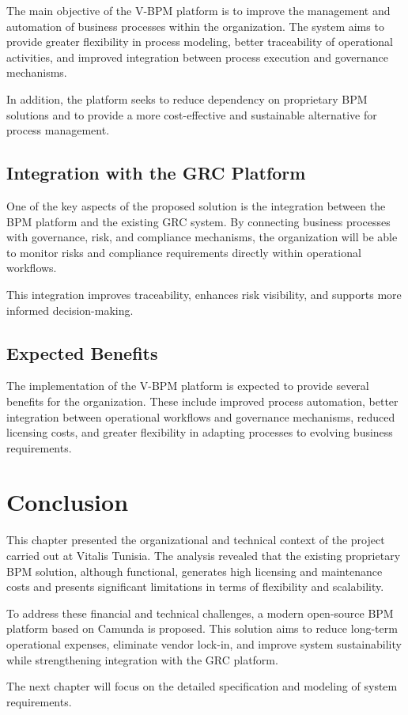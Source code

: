 The main objective of the V-BPM platform is to improve the management and automation of business processes within the organization. The system aims to provide greater flexibility in process modeling, better traceability of operational activities, and improved integration between process execution and governance mechanisms.

In addition, the platform seeks to reduce dependency on proprietary BPM solutions and to provide a more cost-effective and sustainable alternative for process management.

\subsection{Integration with the GRC Platform}

One of the key aspects of the proposed solution is the integration between the BPM platform and the existing GRC system. By connecting business processes with governance, risk, and compliance mechanisms, the organization will be able to monitor risks and compliance requirements directly within operational workflows.

This integration improves traceability, enhances risk visibility, and supports more informed decision-making.

\subsection{Expected Benefits}

The implementation of the V-BPM platform is expected to provide several benefits for the organization. These include improved process automation, better integration between operational workflows and governance mechanisms, reduced licensing costs, and greater flexibility in adapting processes to evolving business requirements.

\section{Conclusion}

This chapter presented the organizational and technical context of the project carried out at Vitalis Tunisia. The analysis revealed that the existing proprietary BPM solution, although functional, generates high licensing and maintenance costs and presents significant limitations in terms of flexibility and scalability.

To address these financial and technical challenges, a modern open-source BPM platform based on Camunda is proposed. This solution aims to reduce long-term operational expenses, eliminate vendor lock-in, and improve system sustainability while strengthening integration with the GRC platform.

The next chapter will focus on the detailed specification and modeling of system requirements.